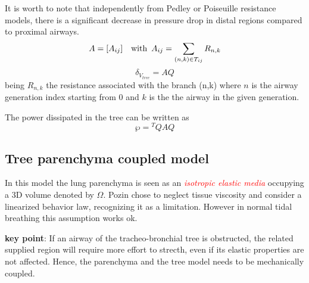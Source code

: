 \documentclass[11pt]{article}
\begin{document}
It is worth to note that independently from Pedley or Poiseuille resistance models, there is a significant decrease in pressure drop in distal regions compared to proximal airways.
$$A= [A_{ij}] \hspace{1em} \text{with} \hspace{0.5em} A_{ij} = \sum_{(n,k)\in T_{ij}}R_{n,k}$$
$$\delta_{V_{tree}}=AQ$$
being $R_{n,k}$ the resistance associated with the branch (n,k) where $n$ is the airway generation index starting from 0 and $k$ is the the airway in the given generation.

The power dissipated in the tree can be written as
$$\wp = {}^TQAQ$$
\subsection{Tree parenchyma coupled model}
In this model the lung parenchyma is seen as an \textcolor{red}{\emph{isotropic elastic media}} occupying a 3D volume denoted by $\Omega$. Pozin chose to neglect tissue viscosity and consider a linearized behavior law, recognizing it as a limitation. However in normal tidal breathing this assumption works ok.
\begin{mdframed}
\textbf{key point}: If an airway of the tracheo-bronchial tree is obstructed, the related supplied region will require more effort to strecth, even if its elastic properties are not affected. Hence, the parenchyma and the tree model needs to be mechanically coupled.
\end{mdframed}
\end{document}
